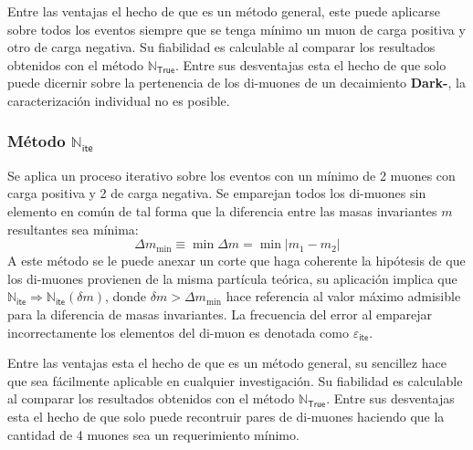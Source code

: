 Entre las ventajas el hecho de que es un método general, este puede aplicarse sobre todos los eventos siempre que se tenga mínimo un muon de carga positiva y otro de carga negativa. Su fiabilidad es calculable al comparar los resultados obtenidos con el método $\mathbb{N}_\textsf{True}$. Entre sus desventajas esta el hecho de que solo puede dicernir sobre la pertenencia de los di-muones de un decaimiento \textbf{Dark-}\SUSY, la caracterización individual no es posible.


\subsubsection{Método $\mathbb{N}_\textsf{ite}$}
 
Se aplica un proceso iterativo sobre los eventos con un mínimo de 2 muones con carga positiva y 2 de carga negativa. Se emparejan todos los di-muones sin elemento en común de tal forma que la diferencia entre las masas invariantes $m$ resultantes sea mínima:
\begin{equation}
\Delta m_{\min} \equiv \min{\Delta m}  = \min{|m_1-m_2|}
\end{equation}
A este método se le puede anexar un corte que haga coherente la hipótesis de que los di-muones provienen de la misma partícula teórica, su aplicación implica que $\mathbb{N}_\textsf{ite} \Rightarrow \mathbb{N}_\textsf{ite}(\delta m)$, donde $\delta m > \Delta m_{\min}$ hace referencia al valor máximo admisible para la diferencia de masas invariantes. La frecuencia del error al emparejar incorrectamente los elementos del di-muon es denotada como $\varepsilon_\textsf{ite}$.

Entre las ventajas esta el hecho de que es un método general, su sencillez hace que sea fácilmente aplicable en cualquier investigación. Su fiabilidad es calculable al comparar los resultados obtenidos con el método $\mathbb{N}_\textsf{True}$. Entre sus desventajas esta el hecho de que solo puede recontruir pares de di-muones haciendo que la cantidad de 4 muones sea un requerimiento mínimo.















